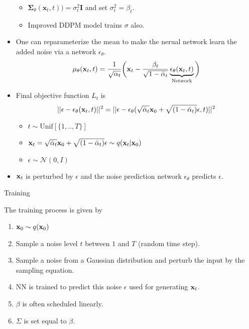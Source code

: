 \begin{itemize}
\begin{itemize}
			\item $\boldsymbol{\Sigma}_\theta(\mathbf{x}_t, t)) = \sigma_t^2\mathbf{I}$ and set $\sigma_t^2 = \beta_t$.
		\item Improved DDPM model trains $\sigma$ also.
		\end{itemize}
	\item One can reparameterize the mean to make the nerual network learn the added noise via a network $\epsilon_\theta$.
		$$\mu_\theta({\mathbf{x}}_t, t) = \frac{1}{\sqrt{\alpha_t}}\bigg({\mathbf{x}}_t - \frac{\beta_t}{\sqrt{1-\bar{\alpha}_t}}\underbrace{\epsilon_\theta({\mathbf{x}}_t,t)}_{\text{Network}}\bigg)$$
	\item Final objective function $L_t$ is
		$$||\epsilon -\epsilon_\theta({\mathbf{x}}_t,t)||^2 = ||\epsilon -\epsilon_\theta(\sqrt{\bar{\alpha}_t}{\mathbf{x}}_0+\sqrt{(1-\bar{\alpha}_t)}\epsilon,t)||^2 $$
		\begin{itemize}
			\item $t\sim\text{Unif}[\{1,..,T\}]$ 
			\item ${\mathbf{x}}_t=\sqrt{\bar{\alpha}_t}{\mathbf{x}}_0+\sqrt{(1-\bar{\alpha}_t)}\epsilon \sim q({\mathbf{x}}_t|{\mathbf{x}}_0)$
			\item $\epsilon\sim \mathcal{N}(0,I)$
		\end{itemize}
	\item ${\mathbf{x}}_t$ is perturbed by $\epsilon$ and the noise prediction network $\epsilon_\theta$ predicts $\epsilon$.
\end{itemize}

\newpage
\begin{algorithm}[t]
	\caption{Training}
	\label{alg:diffusion_training}
\end{algorithm}

The training process is given by
\begin{enumerate}
	\item ${\mathbf{x}}_0\sim q({\mathbf{x}}_0)$ 
	\item Sample a noise level $t$ between $1$ and $T$ (\ie random time step).
	\item Sample a noise from a Gaussian distribution and perturb the input by the sampling equation.
	\item NN is trained to predict this noise $\epsilon$ used for generating ${\mathbf{x}}_t$.
	\item $\beta$ is often scheduled linearly.
	\item $\Sigma$ is set equal to $\beta$.
\end{enumerate}


